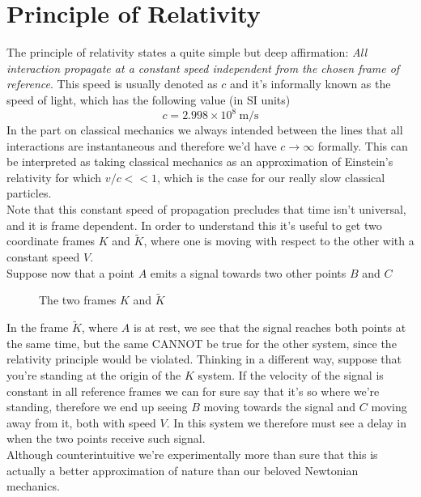 \documentclass[../electromagnetism.tex]{subfiles}
\begin{document}
\section{Principle of Relativity}
The principle of relativity states a quite simple but deep affirmation: \emph{All interaction propagate at a constant speed independent from the chosen frame of reference}. This speed is usually denoted as $c$ and it's informally known as the speed of light, which has the following value (in SI units)
\begin{equation}
	c=2.998\times10^8\ \mathrm{m/s}
	\label{eq:clight}
\end{equation}
In the part on classical mechanics we always intended between the lines that all interactions are instantaneous and therefore we'd have $c\to\infty$ formally. This can be interpreted as taking classical mechanics as an approximation of Einstein's relativity for which $v/c<<1$, which is the case for our really slow classical particles.\\
Note that this constant speed of propagation precludes that time isn't universal, and it is frame dependent. In order to understand this it's useful to get two coordinate frames $K$ and $\tilde{K}$, where one is moving with respect to the other with a constant speed $V$.\\
Suppose now that a point $A$ emits a signal towards two other points $B$ and $C$ %
%
\begin{figure}[H]
	\centering
	\label{fig:srframestime}
	\caption{The two frames $K$ and $\tilde{K}$}
\end{figure}
In the frame $\tilde{K}$, where $A$ is at rest, we see that the signal reaches both points at the same time, but the same CANNOT be true for the other system, since the relativity principle would be violated. Thinking in a different way, suppose that you're standing at the origin of the $K$ system. If the velocity of the signal is constant in all reference frames we can for sure say that it's so where we're standing, therefore we end up seeing $B$ moving towards the signal and $C$ moving away from it, both with speed $V$. In this system we therefore must see a delay in when the two points receive such signal.\\
Although counterintuitive we're experimentally more than sure that this is actually a better approximation of nature than our beloved Newtonian mechanics.
\end{document}
